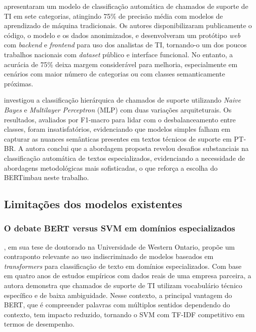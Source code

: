 \documentclass[
    12pt,                %
    openright,           %
    oneside,             %
    a4paper,             %
    english,             %
    brazil               %
]{abntex2}
\begin{document}
 apresentaram um modelo de classificação automática de chamados de suporte de TI em sete categorias, atingindo 75\% de precisão média com modelos de aprendizado de máquina tradicionais. Os autores disponibilizaram publicamente o código, o modelo e os dados anonimizados, e desenvolveram um protótipo \textit{web} com \textit{backend} e \textit{frontend} para uso dos analistas de TI, tornando-o um dos poucos trabalhos nacionais com \textit{dataset} público e interface funcional. No entanto, a acurácia de 75\% deixa margem considerável para melhoria, especialmente em cenários com maior número de categorias ou com classes semanticamente próximas.

 investigou a classificação hierárquica de 
chamados de suporte utilizando \textit{Naive Bayes} e 
\textit{Multilayer Perceptron} (MLP) com duas variações arquiteturais. 
Os resultados, avaliados por F1-macro para lidar com o 
desbalanceamento entre classes, foram insatisfatórios, evidenciando 
que modelos simples falham em capturar as nuances semânticas presentes 
em textos técnicos de suporte em PT-BR. A autora conclui que a 
abordagem proposta revelou desafios substanciais na classificação 
automática de textos especializados, evidenciando a necessidade de 
abordagens metodológicas mais sofisticadas, o que reforça a escolha 
do BERTimbau neste trabalho.

\subsection{Limitações dos modelos existentes}
\label{subsec:helpdesk_limitacoes}

\subsubsection{O debate BERT versus SVM em domínios especializados}
\label{subsubsec:helpdesk_debate}

, em sua tese de doutorado na Universidade de Western Ontario, propõe um contraponto relevante ao uso indiscriminado de modelos baseados em \textit{transformers} para classificação de texto em domínios especializados. Com base em quatro anos de estudos empíricos com dados reais de uma empresa parceira, a autora demonstra 
que chamados de suporte de TI utilizam vocabulário técnico específico 
e de baixa ambiguidade. Nesse contexto, a principal vantagem do BERT, que é compreender 
palavras com múltiplos sentidos dependendo do contexto, tem impacto 
reduzido, tornando o SVM com TF-IDF competitivo em termos de 
desempenho.
\end{document}
